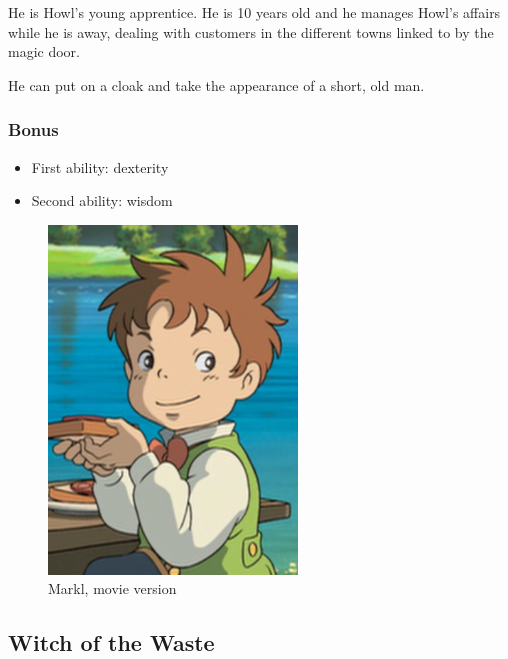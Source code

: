 \begin{minipage}[t]{0.5\textwidth}
He is Howl’s young apprentice. He is 10 years old and he manages Howl's affairs while he is away, dealing with customers in the different towns linked to by the magic door.

He can put on a cloak and take the appearance of a short, old man.

\subsubsection{Bonus}
\begin{itemize}
	\item First ability: dexterity
	\item Second ability: wisdom
\end{itemize}

\end{minipage}%
%
\hfill
\begin{minipage}[t]{0.4\textwidth}
  \begin{figure}[H]
    \hfill\includegraphics{Images/Characters/markl_portrait}
    \caption{Markl, movie version}
  \end{figure}
\end{minipage}

\subsection{Witch of the Waste}

